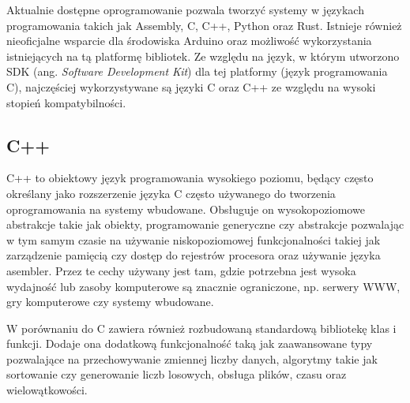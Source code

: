 Aktualnie dostępne oprogramowanie pozwala tworzyć systemy w językach programowania takich jak
Assembly, C, C++, Python oraz Rust. Istnieje również nieoficjalne wsparcie dla środowiska
Arduino oraz możliwość wykorzystania istniejących na tą platformę bibliotek.
Ze względu na język, w którym utworzono SDK (ang. \textit{Software Development Kit}) dla
tej platformy (język programowania C), najczęściej wykorzystywane są języki C oraz C++
ze względu na wysoki stopień kompatybilności.

\subsection*{C++}
C++ to obiektowy język programowania wysokiego poziomu, będący często określany jako
rozszerzenie języka C często używanego do tworzenia oprogramowania na systemy wbudowane.
Obsługuje on wysokopoziomowe abstrakcje takie jak obiekty, programowanie generyczne czy
abstrakcje pozwalając w tym samym czasie na używanie niskopoziomowej funkcjonalności 
takiej jak zarządzenie pamięcią czy dostęp do rejestrów procesora oraz używanie języka asembler.
Przez te cechy używany jest tam, gdzie potrzebna jest wysoka wydajność lub zasoby komputerowe
są znacznie ograniczone, np. serwery WWW, gry komputerowe czy systemy wbudowane.

W porównaniu do C zawiera również rozbudowaną standardową bibliotekę klas i funkcji.
Dodaje ona dodatkową funkcjonalność taką jak zaawansowane typy pozwalające na
przechowywanie zmiennej liczby danych, algorytmy takie jak sortowanie czy 
generowanie liczb losowych, obsługa plików, czasu oraz wielowątkowości.
